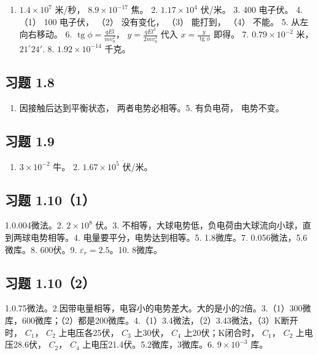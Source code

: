 \begin{enumerate}
\def\labelenumi{\arabic{enumi}.}
\tightlist
\item
  \(1.4 \times 10^{7}\) 米/秒， \(8.9 \times 10^{-17}\) 焦。 2.
  \(1.17 \times 10^{4}\) 伏/米。 3. 400 电子伏。 4. （1） 100 电子伏，
  （2） 没有变化， （3） 能打到， （4） 不能。 5. 从左向右移动。 6.
  \(\operatorname{tg} \phi = \frac{q E l}{m v_0^2}\)，
  \(y = \frac{q E l^3}{2 m v_0^3}\) 代入
  \(x = \frac{y}{\operatorname{tg} \phi}\) 即得。 7.
  \(0.79 \times 10^{-2}\) 米， \(21^{\circ}24'\). 8.
  \(1.92 \times 10^{-14}\) 千克。
\end{enumerate}

\subsection{习题 1.8}\label{ux4e60ux9898-1.8-1}

\begin{enumerate}
\def\labelenumi{\arabic{enumi}.}
\setcounter{enumi}{3}
\tightlist
\item
  因接触后达到平衡状态， 两者电势必相等。5. 有负电荷， 电势不变。
\end{enumerate}

\subsection{习题 1.9}\label{ux4e60ux9898-1.9-1}

\begin{enumerate}
\def\labelenumi{\arabic{enumi}.}
\tightlist
\item
  \(3 \times 10^{-2}\) 牛。 2. \(1.67 \times 10^{5}\) 伏/米。
\end{enumerate}

\subsection{习题 1.10（1）}\label{ux4e60ux9898-1.101-1}

1.0.004微法。2. \(2 \times 10^{8}\) 伏。3.
不相等，大球电势低，负电荷由大球流向小球，直到两球电势相等。4.
电量要平分，电势达到相等。5. 1.8微库。7. 0.056微法，5.6微库。8.
600伏。9. \(\varepsilon_{r} = 2.5\)。10. 8微库。

\subsection{习题 1.10（2）}\label{ux4e60ux9898-1.102-1}

1.0.75微法。2.因带电量相等，电容小的电势差大。大的是小的2倍。3.（1）300微库，600微库；（2）都是200微库。4.（1）3.4微法，（2）3.43微法，（3）K断开时，
\(C_{1}\)， \(C_{2}\) 上电压各25伏， \(C_{3}\) 上30伏， \(C_{4}\)
上20伏；K闭合时， \(C_{1}\)， \(C_{2}\) 上电压28.6伏， \(C_{2}\)，
\(C_{4}\) 上电压21.4伏。5.2微库，3微库。6. \(9\times10^{-3}\) 库。

